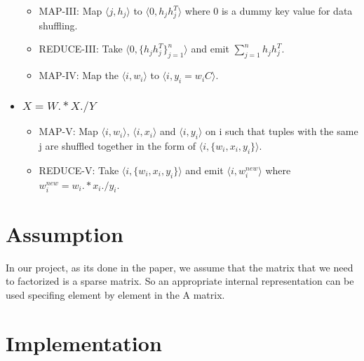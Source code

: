 \documentclass[a4paper,12pt]{article}
\begin{document}
\begin{itemize}
       \begin{itemize}

         \item MAP-III: Map $\langle j, h_j \rangle$ to  $\langle 0,
           h_j h_j^T \rangle$ where 0 is a dummy key value for data
           shuffling.

          \item REDUCE-III: Take $\langle 0, \{h_j h_j^T\}_{j=1}^{n}
            \rangle $ and emit $\sum_{j=1}^{n} h_j h_j^T $.

         \item MAP-IV: Map the $ \langle i, w_i \rangle$ to $ \langle
           i, y_i = w_iC \rangle$.

       \end{itemize}


      \item \subsubsection{$ X = W .* X ./ Y $}
        \begin{itemize}

         \item MAP-V: Map $\langle i, w_i \rangle$, $\langle i, x_i
           \rangle$ and $\langle i, y_i \rangle$ on i such that tuples
           with the same j are shuffled together in the form of
           $\langle i, \{w_i, x_i, y_i\} \rangle$.

          \item REDUCE-V: Take $\langle i, \{w_i, x_i, y_i\} \rangle$
            and emit $\langle i, w_i^{new} \rangle$ where $w_i^{new} =
            w_i .* x_i ./ y_i $.

       \end{itemize}

    \end{itemize}




\section{Assumption}

In our project, as its done in the paper, we assume that the matrix that we need to factorized is a sparse matrix. So an appropriate internal representation can be used specifing element by element in the A matrix.

\section{Implementation}
\label{implementation}
\end{document}
